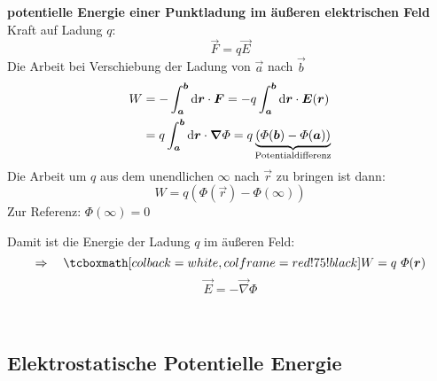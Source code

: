 \textbf{potentielle Energie einer Punktladung im äußeren elektrischen Feld}\\
Kraft auf Ladung $ q $:
\begin{equation*}
\vec{F} = q \vec{E}
\end{equation*}
Die Arbeit bei Verschiebung der Ladung von $ \vec{a} $ nach $ \vec{b} $
\begin{align*}
W &= - \int_{\bm{a}}^{\bm{b}} \textrm{d}\bm{r} \cdot \bm{F} = - q \int_{\bm{a}}^{\bm{b}} \textrm{d}\bm{r} \cdot \bm{E}(\bm{r})\\
&= q \int_{\bm{a}}^{\bm{b}} \textrm{d}\bm{r} \cdot \bm{\nabla} \varPhi = q \underbrace{( \varPhi(\bm{b}) - \varPhi(\bm{a}))}_{\textrm{Potentialdifferenz}}
\end{align*}
Die Arbeit um $ q $ aus dem unendlichen $ \infty $ nach $ \vec{r} $ zu bringen ist dann:
\begin{equation*}
W = q (\Phi(\vec{r}) - \Phi(\infty))
\end{equation*}
Zur Referenz: $ \Phi(\infty) = 0 $\\
\begin{minipage}{.6\linewidth}
	Damit ist die Energie der Ladung $ q $ im äußeren Feld:
	\begin{equation*}
	\Rightarrow \quad \rmbox{W = q \ \Phi(\vec{r})}
	\end{equation*}
	\begin{equation*}
	\vec{E} = - \vec{\nabla} \Phi
	\end{equation*}
\end{minipage}%
\begin{minipage}{.4\linewidth}
	
	
	\flushright
\end{minipage}%
\\
\subsection{Elektrostatische Potentielle Energie}

